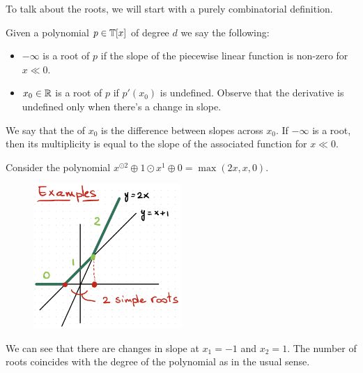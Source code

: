 \documentclass[12pt]{memoir}
\begin{document}
To talk about the roots, we will start with a purely combinatorial definition. 

\begin{Def}
    Given a polynomial $p\in\mathbb{T}[x]$ of degree $d$ we say the following:
    \begin{itemize}
        \item $-\infty$ is a root of $p$ if the slope of the piecewise linear function is non-zero for $x\ll 0$.
        \item $x_0\in\mathbb{R}$ is a root of $p$ if $p'(x_0)$ is undefined. Observe that the derivative is undefined only when there's a change in slope.
    \end{itemize}
    We say that the  of $x_0$ is the difference between slopes across $x_0$. If $-\infty$ is a root, then its multiplicity is equal to the slope of the associated function for $x\ll 0$.
\end{Def}

\begin{Ex}
    Consider the polynomial $x^{\odot2}\oplus1\odot x^1\oplus 0=\max(2x,x,0)$.
    \begin{figure}[h!]
        \centering
        \includegraphics[width=0.5\textwidth]{figs/fig3-3SimpleFiniteRootsTropicalPolynomial.png}
        \label{fig:3.3-SimpleFiniteRoots}
    \end{figure}
    We can see that there are changes in slope at $x_1=-1$ and $x_2=1$. The number of roots coincides with the degree of the polynomial as in the usual sense.
\end{Ex}
\end{document}
